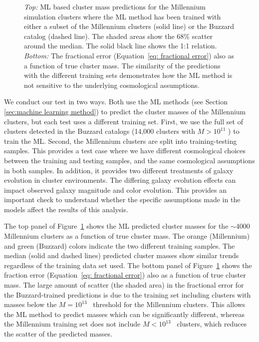 \documentclass[fleqn,usenatbib]{mnras}
\begin{document}
\begin{figure}
	\caption[ML based cluster mass predictions in the Millennium Simulation]{\emph{Top:} ML based cluster mass predictions for the Millennium simulation clusters where the ML method has been trained with either a subset of the Millennium clusters (solid line) or the Buzzard catalog (dashed line). The shaded areas show the 68\% scatter around the median. The solid black line shows the 1:1 relation. \emph{Bottom:} The fractional error (Equation~\ref{eq: fractional error}) also as a function of true cluster mass. The similarity of the predictions with the different training sets demonstrates how the ML method is not sensitive to the underlying cosmological assumptions.} \label{fig: mill buzz comparison} 
\end{figure}

We conduct our test in two ways. Both use the ML methods (see Section \ref{sec:machine learning method}) to predict the cluster masses of the Millennium clusters, but each test uses a different training set. First, we use the full set of clusters detected in the Buzzard catalogs (14,000 clusters with $M > 10^{11}$ \msol) to train the ML. Second, the Millennium clusters are split into training-testing samples. This provides a test case where we have different cosmological choices between the training and testing samples, and the same cosmological assumptions in both samples. In addition, it provides two different treatments of galaxy evolution in cluster environments. The differing galaxy evolution effects can impact observed galaxy magnitude and color evolution. This provides an important check to understand whether the specific assumptions made in the models affect the results of this analysis.

The top panel of Figure~\ref{fig: mill buzz comparison} shows the ML predicted cluster masses for the $\sim$4000 Millennium clusters as a function of true cluster mass. The orange (Millennium) and green (Buzzard) colors indicate the two different training samples. The median (solid and dashed lines) predicted cluster masses show similar trends regardless of the training data set used. The bottom panel of Figure~\ref{fig: mill buzz comparison} shows the fraction error (Equation~\ref{eq: fractional error}) also as a function of true cluster mass. The large amount of scatter (the shaded area) in the fractional error for the Buzzard-trained predictions is due to the training set including clusters with masses below the $M = 10^{13}$ \Msol\ threshold for the Millennium clusters. This allows the ML method to predict masses which can be significantly different, whereas the Millennium training set does not include $M < 10^{13}$ \Msol\ clusters, which reduces the scatter of the predicted masses.
\end{document}
